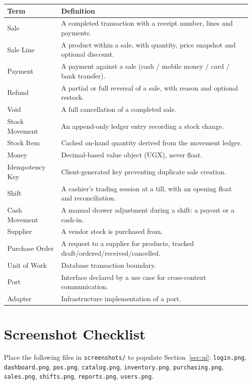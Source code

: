 \documentclass[11pt,a4paper]{article}
\begin{document}
\begin{table}[htbp]\centering
\small
\begin{tabular}{@{}p{}p{}@{}}
\toprule
\textbf{Term} & \textbf{Definition} \\
\midrule
Sale & A completed transaction with a receipt number, lines and payments. \\
Sale Line & A product within a sale, with quantity, price snapshot and optional discount. \\
Payment & A payment against a sale (cash / mobile money / card / bank transfer). \\
Refund & A partial or full reversal of a sale, with reason and optional restock. \\
Void & A full cancellation of a completed sale. \\
Stock Movement & An append-only ledger entry recording a stock change. \\
Stock Item & Cached on-hand quantity derived from the movement ledger. \\
Money & Decimal-based value object (UGX), never float. \\
Idempotency Key & Client-generated key preventing duplicate sale creation. \\
Shift & A cashier's trading session at a till, with an opening float and reconciliation. \\
Cash Movement & A manual drawer adjustment during a shift: a payout or a cash-in. \\
Supplier & A vendor stock is purchased from. \\
Purchase Order & A request to a supplier for products, tracked draft/ordered/received/cancelled. \\
Unit of Work & Database transaction boundary. \\
Port & Interface declared by a use case for cross-context communication. \\
Adapter & Infrastructure implementation of a port. \\
\bottomrule
\end{tabular}
\end{table}

\section{Screenshot Checklist}
\label{app:screenshots}

Place the following files in \texttt{screenshots/} to populate Section~\ref{sec:ui}:
\texttt{login.png}, \texttt{dashboard.png}, \texttt{pos.png}, \texttt{catalog.png},
\texttt{inventory.png}, \texttt{purchasing.png}, \texttt{sales.png}, \texttt{shifts.png},
\texttt{reports.png}, \texttt{users.png}.
\end{document}
